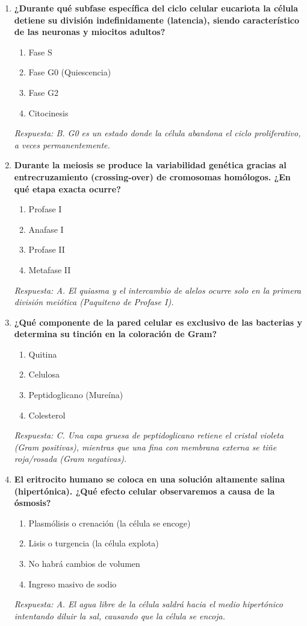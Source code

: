 \documentclass[spanish,letterpaper,oneside]{article}
\begin{document}
\begin{enumerate}[label=\textbf{\arabic*.}]
    \item \textbf{¿Durante qué subfase específica del ciclo celular eucariota la célula detiene su división indefinidamente (latencia), siendo característico de las neuronas y miocitos adultos?}
    \begin{enumerate}
        \item[A)] Fase S
        \item[B)] Fase G0 (Quiescencia)
        \item[C)] Fase G2
        \item[D)] Citocinesis
    \end{enumerate}
    \textit{Respuesta: B. G0 es un estado donde la célula abandona el ciclo proliferativo, a veces permanentemente.}

    \item \textbf{Durante la meiosis se produce la variabilidad genética gracias al entrecruzamiento (crossing-over) de cromosomas homólogos. ¿En qué etapa exacta ocurre?}
    \begin{enumerate}
        \item[A)] Profase I
        \item[B)] Anafase I
        \item[C)] Profase II
        \item[D)] Metafase II
    \end{enumerate}
    \textit{Respuesta: A. El quiasma y el intercambio de alelos ocurre solo en la primera división meiótica (Paquiteno de Profase I).}

    \item \textbf{¿Qué componente de la pared celular es exclusivo de las bacterias y determina su tinción en la coloración de Gram?}
    \begin{enumerate}
        \item[A)] Quitina
        \item[B)] Celulosa
        \item[C)] Peptidoglicano (Mureína)
        \item[D)] Colesterol
    \end{enumerate}
    \textit{Respuesta: C. Una capa gruesa de peptidoglicano retiene el cristal violeta (Gram positivas), mientras que una fina con membrana externa se tiñe roja/rosada (Gram negativas).}

    \item \textbf{El eritrocito humano se coloca en una solución altamente salina (hipertónica). ¿Qué efecto celular observaremos a causa de la ósmosis?}
    \begin{enumerate}
        \item[A)] Plasmólisis o crenación (la célula se encoge)
        \item[B)] Lisis o turgencia (la célula explota)
        \item[C)] No habrá cambios de volumen
        \item[D)] Ingreso masivo de sodio
    \end{enumerate}
    \textit{Respuesta: A. El agua libre de la célula saldrá hacia el medio hipertónico intentando diluir la sal, causando que la célula se encoja.}


\end{enumerate}
\end{document}
